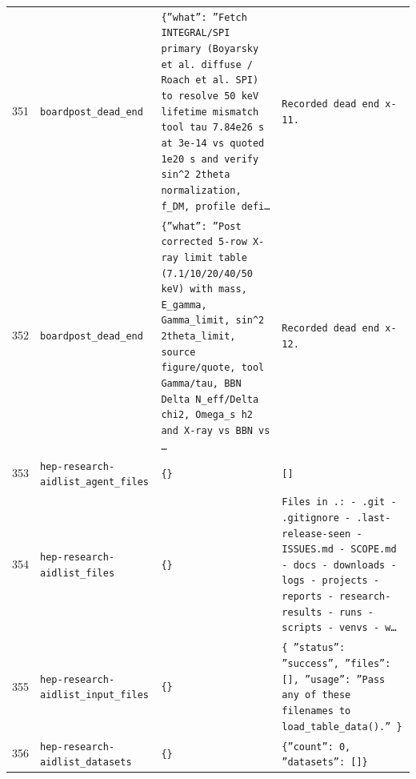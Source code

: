 \documentclass[11pt,a4paper]{article}
\begin{document}
\begin{longtable}{@{}p{}p{}p{}p{}@{}}
351 & \texttt{board}\newline\texttt{post\_\allowbreak{}dead\_\allowbreak{}end} & \texttt{\{''what'':\allowbreak{} ''Fetch INTEGRAL/\allowbreak{}SPI primary (Boyarsky et al. diffuse /\allowbreak{} Roach et al. SPI)\allowbreak{} to resolve 50 keV lifetime mismatch tool tau 7.84e26 s at 3e-14 vs quoted 1e20 s and verify sin\textasciicircum{}\allowbreak{}2 2theta normalization,\allowbreak{} f\_\allowbreak{}DM,\allowbreak{} profile defi\ldots{}\allowbreak{}} & \texttt{Recorded dead end x-11.} \\
352 & \texttt{board}\newline\texttt{post\_\allowbreak{}dead\_\allowbreak{}end} & \texttt{\{''what'':\allowbreak{} ''Post corrected 5-row X-ray limit table (7.1/\allowbreak{}10/\allowbreak{}20/\allowbreak{}40/\allowbreak{}50 keV)\allowbreak{} with mass,\allowbreak{} E\_\allowbreak{}gamma,\allowbreak{} Gamma\_\allowbreak{}limit,\allowbreak{} sin\textasciicircum{}\allowbreak{}2 2theta\_\allowbreak{}limit,\allowbreak{} source figure/\allowbreak{}quote,\allowbreak{} tool Gamma/\allowbreak{}tau,\allowbreak{} BBN Delta N\_\allowbreak{}eff/\allowbreak{}Delta chi2,\allowbreak{} Omega\_\allowbreak{}s h2 and X-ray vs BBN vs \ldots{}\allowbreak{}} & \texttt{Recorded dead end x-12.} \\
353 & \texttt{hep-research-aid}\newline\texttt{list\_\allowbreak{}agent\_\allowbreak{}files} & \texttt{\{\}\allowbreak{}} & \texttt{[]\allowbreak{}} \\
354 & \texttt{hep-research-aid}\newline\texttt{list\_\allowbreak{}files} & \texttt{\{\}\allowbreak{}} & \texttt{Files in .:\allowbreak{}   - .git   - .gitignore   - .last-release-seen   - ISSUES.md   - SCOPE.md   - docs   - downloads   - logs   - projects   - reports   - research-results   - runs   - scripts   - venvs   - w\ldots{}\allowbreak{}} \\
355 & \texttt{hep-research-aid}\newline\texttt{list\_\allowbreak{}input\_\allowbreak{}files} & \texttt{\{\}\allowbreak{}} & \texttt{\{   ''status'':\allowbreak{} ''success'',\allowbreak{}   ''files'':\allowbreak{} []\allowbreak{},\allowbreak{}   ''usage'':\allowbreak{} ''Pass any of these filenames to load\_\allowbreak{}table\_\allowbreak{}data()\allowbreak{}.'' \}\allowbreak{}} \\
356 & \texttt{hep-research-aid}\newline\texttt{list\_\allowbreak{}datasets} & \texttt{\{\}\allowbreak{}} & \texttt{\{''count'':\allowbreak{} 0,\allowbreak{} ''datasets'':\allowbreak{} []\allowbreak{}\}\allowbreak{}} \\

\end{longtable}
\end{document}

